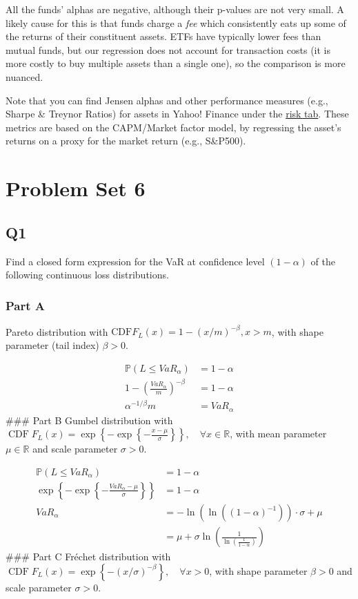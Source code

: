 \documentclass[
  oneside]{book}
\begin{document}
All the funds' alphas are negative, although their p-values are not very small. A likely cause for this is that funds charge a \emph{fee} which consistently eats up some of the returns of their constituent assets. ETFs have typically lower fees than mutual funds, but our regression does not account for transaction costs (it is more costly to buy multiple assets than a single one), so the comparison is more nuanced.

Note that you can find Jensen alphas and other performance measures (e.g., Sharpe \& Treynor Ratios) for assets in Yahoo! Finance under the \href{https://finance.yahoo.com/quote/FCNTX/risk?p=FCNTX}{risk tab}. These metrics are based on the CAPM/Market factor model, by regressing the asset's returns on a proxy for the market return (e.g., S\&P500).

\hypertarget{problem-set-6}{%
\chapter{Problem Set 6}\label{problem-set-6}}

\hypertarget{q1-4}{%
\section{Q1}\label{q1-4}}

Find a closed form expression for the VaR at confidence level \((1-\alpha)\) of the following continuous loss distributions.

\hypertarget{part-a-11}{%
\subsection{Part A}\label{part-a-11}}

Pareto distribution with \(\mathrm{CDF} F_L(x)=1-(x / m)^{-\beta}, x>m\), with shape parameter (tail index) \(\beta>0\).

\[
\begin{aligned}
\mathbb{P}(L \leq VaR_{\alpha}) &= 1-\alpha\\
1-\left( \frac{VaR_{\alpha}}{m} \right)^{-\beta} &= 1-\alpha\\
\alpha^{-1/\beta}m &= VaR_{\alpha}
\end{aligned}
\]
\#\#\# Part B
Gumbel distribution with \(\operatorname{CDF} F_L(x)=\exp \left\{-\exp \left\{-\frac{x-\mu}{\sigma}\right\}\right\}, \quad \forall x \in \mathbb{R}\), with mean parameter \(\mu \in \mathbb{R}\) and scale parameter \(\sigma>0\).

\[
\begin{aligned}
\mathbb{P}(L \leq VaR_{\alpha}) &= 1-\alpha\\
\exp \left\{ -\exp \left\{ - \frac{VaR_{\alpha}-\mu}{\sigma} \right\}  \right\}  &= 1-\alpha\\
VaR_{\alpha} &= -\ln(\ln((1-\alpha)^{-1}))\cdot \sigma+\mu\\
&= \mu + \sigma\ln\left( \frac{1}{\ln\left( \frac{1}{1-\alpha} \right)} \right)
\end{aligned}
\]
\#\#\# Part C
Fréchet distribution with \(\operatorname{CDF} F_L(x)=\exp \left\{-(x / \sigma)^{-\beta}\right\}, \quad \forall x>0\), with shape parameter \(\beta>0\) and scale parameter \(\sigma>0\).
\end{document}
